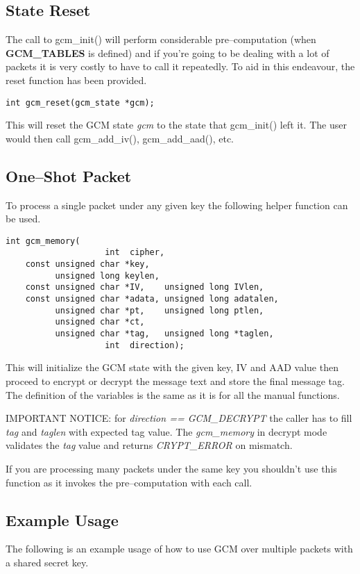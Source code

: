 \documentclass[synpaper]{book}
\begin{document}
\subsection{State Reset}
The call to gcm\_init() will perform considerable pre--computation (when \textbf{GCM\_TABLES} is defined) and if you're going to be dealing with a lot of packets
it is very costly to have to call it repeatedly.  To aid in this endeavour, the reset function has been provided.

\begin{verbatim}
int gcm_reset(gcm_state *gcm);
\end{verbatim}

This will reset the GCM state \textit{gcm} to the state that gcm\_init() left it.  The user would then call gcm\_add\_iv(), gcm\_add\_aad(), etc.

\subsection{One--Shot Packet}
To process a single packet under any given key the following helper function can be used.

\begin{verbatim}
int gcm_memory(
                    int  cipher,
    const unsigned char *key,
          unsigned long keylen,
    const unsigned char *IV,    unsigned long IVlen,
    const unsigned char *adata, unsigned long adatalen,
          unsigned char *pt,    unsigned long ptlen,
          unsigned char *ct,
          unsigned char *tag,   unsigned long *taglen,
                    int  direction);
\end{verbatim}

This will initialize the GCM state with the given key, IV and AAD value then proceed to encrypt or decrypt the message text and store the final
message tag.  The definition of the variables is the same as it is for all the manual functions.

IMPORTANT NOTICE: for \textit{direction == GCM\_DECRYPT} the caller has to fill \textit{tag} and \textit{taglen} with expected
tag value. The \textit{gcm\_memory} in decrypt mode validates the \textit{tag} value and returns \textit{CRYPT\_ERROR} on mismatch.

If you are processing many packets under the same key you shouldn't use this function as it invokes the pre--computation with each call.

\subsection{Example Usage}
The following is an example usage of how to use GCM over multiple packets with a shared secret key.
\end{document}
